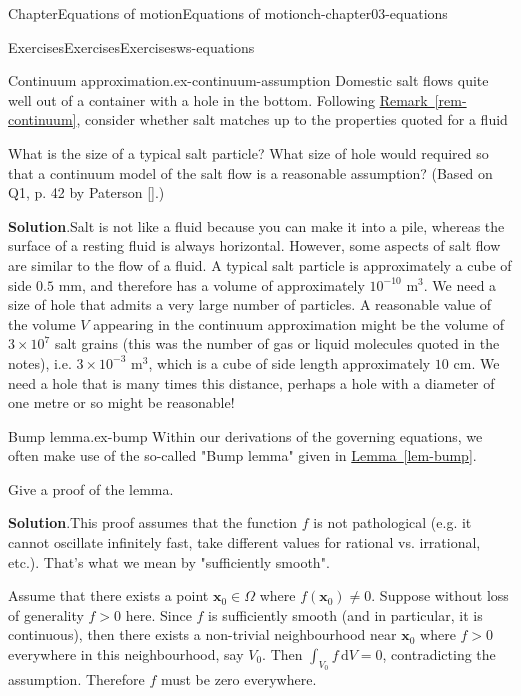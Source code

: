 \documentclass[oneside,10pt,]{book}
\newcommand{\blocktitlefont}{\relax}
\newcommand{\xreffont}{\relax}
\numberwithin{equation}{section}
\newcommand{\de}{\mathrm{d}}
\newcommand{\bx}{\boldsymbol{x}}
\begin{document}
\begin{chapterptx}{Chapter}{Equations of motion}{}{Equations of motion}{}{}{ch-chapter03-equations}
\begin{exercises-section}{Exercises}{Exercises}{}{Exercises}{}{}{ws-equations}
\begin{introduction}{}
\end{introduction}%
\begin{divisionexercise}{1}{Continuum approximation.}{}{ex-continuum-assumption}%
Domestic salt flows quite well out of a container with a hole in the bottom. Following \hyperref[rem-continuum]{Remark~{\xreffont\ref{rem-continuum}}}, consider whether salt matches up to the properties quoted for a fluid%
\par
What is the size of a typical salt particle? What size of hole would required so that a continuum model of the salt flow is a reasonable assumption? (Based on Q1, p. 42 by Paterson \hyperlink{ref-paterson}{[{\xreffont 10}]}.)%
\par\smallskip%
\noindent\textbf{\blocktitlefont Solution}.\hypertarget{ex-continuum-assumption-3}{}\quad{}Salt is not like a fluid because you can make it into a pile, whereas the surface of a resting fluid is always horizontal. However, some aspects of salt flow are similar to the flow of a fluid. A typical salt particle is approximately a cube of side \(0.5\) mm, and therefore has a volume of approximately \(10^{-10}\) m\(^3\). We need a size of hole that admits a very large number of particles. A reasonable value of the volume \(V\) appearing in the continuum approximation might be the volume of \(3\times10^7\) salt grains (this was the number of gas or liquid molecules quoted in the notes), i.e. \(3\times10^{-3}\) m\(^3\), which is a cube of side length approximately \(10\) cm. We need a hole that is many times this distance, perhaps a hole with a diameter of one metre or so might be reasonable!%
\end{divisionexercise}%
\begin{divisionexercise}{2}{Bump lemma.}{}{ex-bump}%
Within our derivations of the governing equations, we often make use of the so-called "Bump lemma" given in \hyperref[lem-bump]{Lemma~{\xreffont\ref{lem-bump}}}.%
\par
Give a proof of the lemma.%
\par\smallskip%
\noindent\textbf{\blocktitlefont Solution}.\hypertarget{ex-bump-3}{}\quad{}This proof assumes that the function \(f\) is not pathological (e.g. it cannot oscillate infinitely fast, take different values for rational vs. irrational, etc.). That's what we mean by "sufficiently smooth".%
\par
Assume that there exists a point \(\bx_0 \in \Omega\) where \(f(\bx_0) \neq 0\). Suppose without loss of generality \(f > 0\) here. Since \(f\) is sufficiently smooth (and in particular, it is continuous), then there exists a non-trivial neighbourhood near \(\bx_0\) where \(f > 0\) everywhere in this neighbourhood, say \(V_0\). Then \(\int_{V_0} f \, \de{V} = 0\), contradicting the assumption. Therefore \(f\) must be zero everywhere.%

\end{divisionexercise}
\end{exercises-section}
\end{chapterptx}
\end{document}
